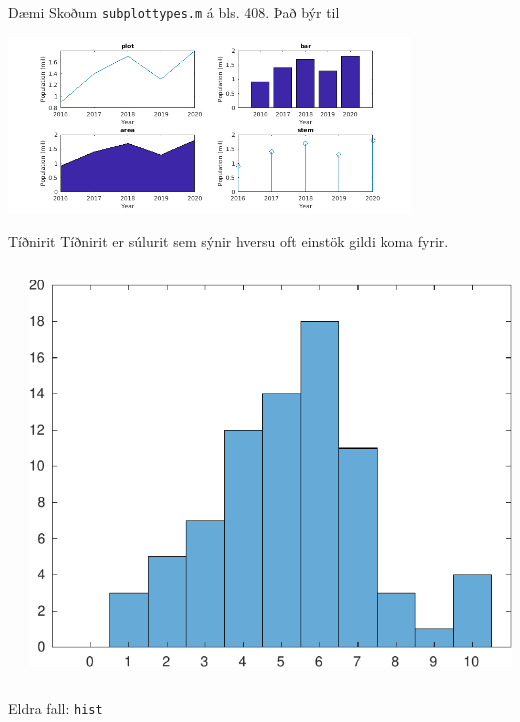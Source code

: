 \documentclass[handout]{beamer}
\begin{document}
\begin{frame}{Dæmi}
\vspace{1cm}
Skoðum \texttt{subplottypes.m} á bls. 408. Það býr til

\begin{center}
\includegraphics[width=0.8\textwidth]{Pics/plottypes.png}
\end{center}
\end{frame}

\begin{frame}[fragile]{Tíðnirit}
Tíðnirit er súlurit sem sýnir hversu oft einstök gildi koma fyrir.
\begin{columns}
    \inputminted[frame=lines, label=histexample.m, fontsize=\small]{matlab}{Code/histexample.m}
\includegraphics[width=\linewidth]{Pics/hist}
\end{columns}
\vspace{\baselineskip}
Eldra fall: \texttt{hist}
\end{frame}
\end{document}
